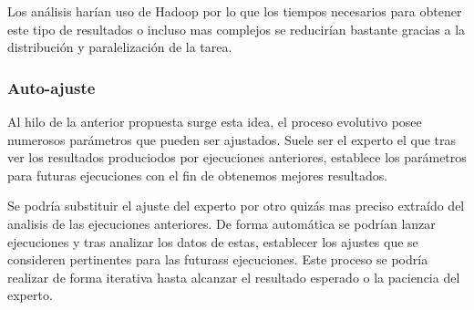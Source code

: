 Los an\'alisis har\'ian uso de Hadoop por lo que los tiempos necesarios para obtener este tipo de resultados o incluso mas complejos se reducir\'ian bastante gracias a la distribuci\'on y paralelizaci\'on de la tarea.

\subsubsection{Auto-ajuste}

Al hilo de la anterior propuesta surge esta idea, el proceso evolutivo posee numerosos par\'ametros que pueden ser ajustados. Suele ser el experto el que tras ver los resultados produciodos por ejecuciones anteriores, establece los par\'ametros para futuras ejecuciones con el fin de obtenemos mejores resultados.

Se podr\'ia substituir el ajuste del experto por otro quiz\'as mas preciso extraído del analisis de las ejecuciones anteriores. De forma autom\'atica se podr\'ian lanzar ejecuciones y tras analizar los datos de estas, establecer los ajustes que se consideren pertinentes para las futurass ejecuciones. Este proceso se podr\'ia realizar de forma iterativa hasta alcanzar el resultado esperado o la paciencia del experto.













